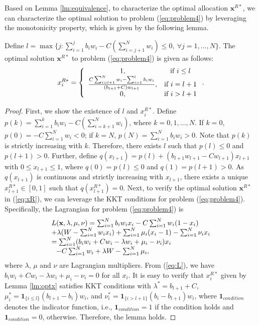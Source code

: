 	Based on Lemma \ref{lm:equivalence}, to characterize the optimal allocation $\mathbf{x}^{R*}$, we can characterize the optimal solution to problem (\ref{eq:problem4}) by leveraging the monotonicity property,
	which is given by the following lemma.
	
	\begin{lm}\label{lm:optx}
		Define $l=\max\{j:\sum_{i=1}^{j}b_iw_i-C(\sum_{i=j+1}^{N}w_i)\le 0,~\forall j=1,\dots,N\}$. The optimal solution $\mathbf{x}^{R*}$ to problem (\ref{eq:problem4}) is given as follows:
		\begin{equation}\label{eq:xR}
		x_i^{R*}=\left\{
		\begin{array}{*{20}c}
		1, & \text{if}~i\le l  \\
		\frac{C\sum_{i=l+1}^N w_i-\sum_{i=1}^l b_iw_i}{(b_{l+1}+C)w_{l+1}}, & {\text{if}~i=l+1}  \\
		0, & \text{if}~i>l+1
		\end{array} \right..
		\end{equation}
	\end{lm}
	\begin{proof}
		First, we show the existence of $l$ and $x_i^{R*}$. Define $p(k)=\sum_{i=1}^{k}b_iw_i-C(\sum_{i=k+1}^{N}w_i)$, where $k=0,1,\dots,N$. If $k=0$, $p(0)=-C\sum_{i=1}^{N}w_i<0$; if $k=N$, $p(N)=\sum_{i=1}^{N}b_iw_i>0$. Note that $p(k)$ is strictly increasing with $k$. Therefore, there exists $l$ such that $p(l)\le 0$ and $p(l+1)>0$. Further, define $q(x_{l+1})=p(l)+(b_{l+1}w_{l+1}-Cw_{l+1})x_{l+1}$ with $0\le x_{l+1}\le 1$, where $q(0)=p(l)\le 0$ and $q(1)=p(l+1)>0$. As $q(x_{l+1})$ is continuous and strictly increasing with $x_{l+1}$, there exists a unique $x_{l+1}^{R*}\in[0,1]$ such that $q(x_{l+1}^{R*})=0$. Next, to verify the optimal solution $\mathbf{x}^{R*}$ in (\ref{eq:xR}), we can leverage the KKT conditions for problem (\ref{eq:problem4}). Specifically, the Lagrangian for problem (\ref{eq:problem4}) is
		\begin{equation}%
		\hspace{-0.0cm}
		\begin{array}
		[c]{lll}%
		L(\mathbf{x},\lambda,\mu,\nu)=\sum_{i=1}^{N}b_iw_ix_i-C\sum_{i=1}^{N}w_i(1-x_i)\\
		+\lambda(W-\sum_{i=1}^Nw_ix_i)+\sum_{i=1}^N\mu_i(x_i-1)-\sum_{i=1}^N\nu_ix_i\\
		=\sum_{i=1}^{N}(b_iw_i+Cw_i-\lambda w_i+\mu_i-\nu_i)x_i\\
		~~-C\sum_{i=1}^{N}w_i+\lambda W-\sum_{i=1}^{N}\mu_i,
		\end{array}
		\label{eq:L}
		\end{equation}
		where $\lambda$, $\mu$ and $\nu$ are Lagrangian multipliers. From (\ref{eq:L}), we have $b_iw_i+Cw_i-\lambda w_i+\mu_i-\nu_i=0$ for all $x_i$. It is easy to verify that $x_i^{R*}$ given by Lemma \ref{lm:optx} satisfies KKT conditions with $\lambda^*=b_{l+1}+C$, $\mu_i^*=\mathbf{1}_{\{i\le l\}}(b_{l+1}-b_i)w_i$, and $\nu_i^*=\mathbf{1}_{\{i>l+1\}}(b_i-b_{l+1})w_i$, where $\mathbf{1}_{condition}$ denotes the indicator function, i.e., $\mathbf{1}_{condition}=1$ if the condition holds and $\mathbf{1}_{condition}=0$, otherwise. Therefore, the lemma holds.
	\end{proof}
	

